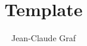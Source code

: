 \documentclass{scrartcl}
\begin{document}
    \rhead{\today}

    \title{Template}
    \author{Jean-Claude Graf}
    \maketitle

    \tableofcontents

    
    
    
    
    
\end{document}
